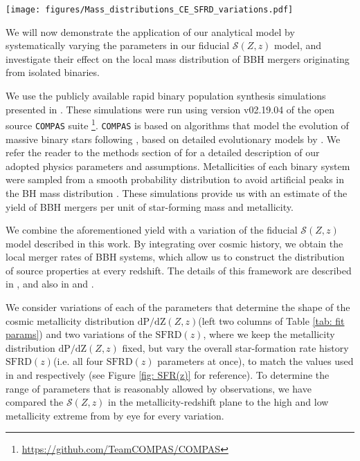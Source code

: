 \documentclass[twocolumn]{aastex631}
\newcommand{\SFRDzZ}{\ensuremath{\mathcal{S}(Z,z)}\xspace}
\newcommand{\SFRDz}{\ensuremath{\mathrm{SFRD}(z)}\xspace}
\newcommand{\dpdZ}{\ensuremath{\mathrm{dP/dZ}(Z,z)}\xspace}
\newcommand{\COMPAS}{{\tt COMPAS}\xspace}
\begin{document}
\begin{figure*}
\centering
{}
\texttt{[image: figures/Mass\_distributions\_CE\_SFRD\_variations.pdf]}
\caption{Same as Figure \ref{fig: mass dists}, but for the Common envelope channel. 
   \label{fig: mass dists}
  }
\end{figure*}




We will now demonstrate the application of our analytical model by systematically varying the parameters in our fiducial \SFRDzZ model, and investigate their effect on the local mass distribution of BBH mergers originating from isolated binaries. 


We use the publicly available rapid binary population synthesis simulations presented in \cite{vanson+2022}. 
These simulations were run using version v02.19.04 of the open source \COMPAS suite \citep{COMPAS_method}\footnote{\url{https://github.com/TeamCOMPAS/COMPAS}}. \COMPAS is based on algorithms that model the evolution of massive binary stars following \citet{Hurley+2000, Hurley+2002}, based on detailed evolutionary models by \citet{Pols+1998}.  We refer the reader to the methods section of \cite{vanson+2022} for a detailed description of our adopted physics parameters and assumptions.
%
Metallicities of each binary system were sampled from a smooth probability distribution to avoid artificial peaks in the BH mass distribution \citep[e.g.][]{Dominik2015,Kummer_thesis}. 
These simulations provide us with an estimate of the yield of BBH mergers per unit of star-forming mass and metallicity. 


We combine the aforementioned yield with a variation of the fiducial \SFRDzZ model described in this work. By integrating over cosmic history, we obtain the local merger rates of BBH systems, which allow us to construct the distribution of source properties at every redshift. The details of this framework are described in \cite{vanson+2022}, and also in \cite{Broekgaarden+2021a} and \cite{Neijssel+2019}. 

We consider variations of each of the parameters that determine the shape of the cosmic metallicity distribution \dpdZ (left two columns of Table \ref{tab: fit params}) and two variations of the \SFRDz, where we keep the metallicity distribution \dpdZ fixed, but vary the overall star-formation rate history  \SFRDz (i.e. all four \SFRDz parameters at once), to match the values used in \cite{Madau+2017} and \cite{Neijssel2019} respectively (see Figure \ref{fig: SFR(z)} for reference). To determine the range of parameters that is reasonably allowed by observations, we have compared the \SFRDzZ in the metallicity-redshift plane to the high and low metallicity extreme from \cite{Chruslinska+2021} by eye for every variation. \\
\end{document}
